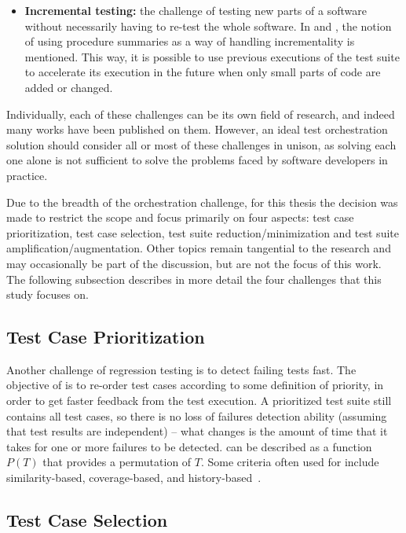 \begin{itemize}
	\item \textbf{Incremental testing:} the challenge of testing new parts of a software without necessarily having to re-test the whole software. In \cite{harman_start-ups_2018} and \cite{ohearn_continuous_2018}, the notion of using procedure summaries as a way of handling incrementality is mentioned. This way, it is possible to use previous executions of the test suite to accelerate its execution in the future when only small parts of code are added or changed.
\end{itemize}

Individually, each of these challenges can be its own field of research, and indeed many works have been published on them.
However, an ideal test orchestration solution should consider all or most of these challenges in unison, as solving each one alone is not sufficient to solve the problems faced by software developers in practice.

Due to the breadth of the orchestration challenge, for this thesis the decision was made to restrict the scope and focus primarily on four aspects: test case prioritization, test case selection, test suite reduction/minimization and test suite amplification/augmentation.
Other topics remain tangential to the research and may occasionally be part of the discussion, but are not the focus of this work.
The following subsection describes in more detail the four challenges that this study focuses on.

\subsection{Test Case Prioritization}
\label{sec:tcp}

Another challenge of regression testing is to detect failing tests fast.
The objective of \tcp is to re-order test cases according to some definition of priority, in order to get faster feedback from the test execution.
A prioritized test suite still contains all test cases, 
so there is no loss of failures detection ability (assuming that test results are independent) -- what changes is the amount of time that it takes for one or more failures to be detected.
\tcp can be described as a function $P(T)$ that provides a permutation of $T$.
Some criteria often used for \tcp include similarity-based, coverage-based, and history-based~\cite{khatibsyarbini_test_2018}.


\subsection{Test Case Selection}
\label{sec:tcs}

